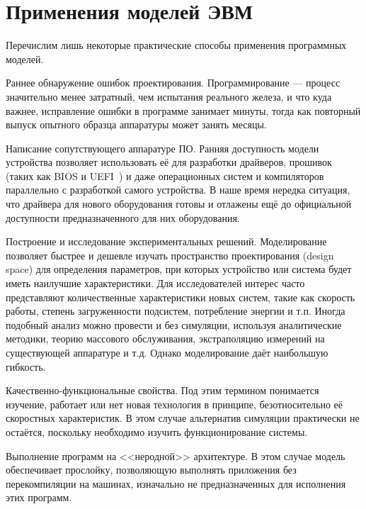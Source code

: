 \section{Применения моделей ЭВМ}

Перечислим лишь некоторые практические способы применения программных моделей.

\begin{description*}
    
\item[Раннее обнаружение ошибок проектирования.] Программирование --- процесс значительно менее затратный, чем испытания реального железа, и что куда важнее, исправление ошибки в программе занимает минуты, тогда как повторный выпуск опытного образца аппаратуры может занять месяцы. 

\item[Написание сопутствующего аппаратуре ПО.] Ранняя доступность модели устройства позволяет использовать её для разработки драйверов, прошивок (таких как BIOS и UEFI~\cite{uefi-itj}) и даже операционных систем и компиляторов параллельно с разработкой самого устройства. В наше время нередка ситуация, что драйвера для нового оборудования готовы и отлажены ещё до официальной доступности предназначенного для них оборудования.

\item[Построение и исследование экспериментальных решений.] Моделирование позволяет быстрее и дешевле  изучать пространство проектирования (\abbr design space) для определения параметров, при которых устройство или система будет иметь наилучшие характеристики. Для исследователей интерес часто представляют количественные характеристики новых систем, такие как скорость работы, степень загруженности подсистем, потребление энергии и т.п. Иногда подобный анализ можно провести и без симуляции, используя аналитические методики, теорию массового обслуживания, экстраполяцию измерений на существующей аппаратуре и т.д. Однако моделирование даёт наибольшую гибкость.

\item[Качественно-функциональные свойства.] Под этим тер\-ми\-ном понимается изучение, работает или нет новая технология в принципе, безотносительно её скоростных характеристик. В этом случае альтернатив симуляции практически не остаётся, поскольку необходимо изучить функционирование системы.

\item[Выполнение программ на <<неродной>> архитектуре.] В этом случае модель обеспечивает прослойку, позволяющую выполнять приложения без перекомпиляции на машинах, изначально не предназначенных для исполнения этих программ. 

\end{description*}

